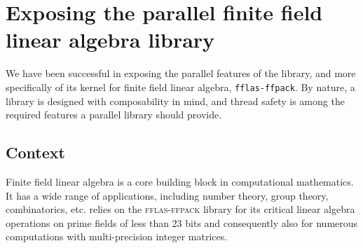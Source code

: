 \documentclass{deliverablereport}
\author{Alexis Breust, Karim Belabas, Jean-Guillaume Dumas, Jeroen
  Demeyer, William B. Hart, Steve Linton, Clément Pernet, Reimer
  Behrends, Nicolas M. Thiéry, Hongguang Zhu}
\newcommand{\fflasffpack}{\textsc{fflas-ffpack}\xspace}
\begin{document}
\maketitle
\githubissuedescription


\tableofcontents



\section{Exposing the parallel finite field linear algebra library \Linbox}

We have been successful in exposing the parallel features of the \Linbox
library, and more specifically of its kernel for finite field linear algebra,
\texttt{fflas-ffpack}. By nature, a library is designed with composability in
mind, and thread safety is among the required features a parallel library should
provide.

\subsection{Context}

Finite field linear algebra is a core building block in computational mathematics.
It has a wide range of applications, including number theory, group theory, combinatorics, etc. \SageMath relies on the
\fflasffpack library for its critical linear algebra operations on prime fields of less than 23 bits and consequently
also for numerous computations with multi-precision integer matrices.  
\end{document}
